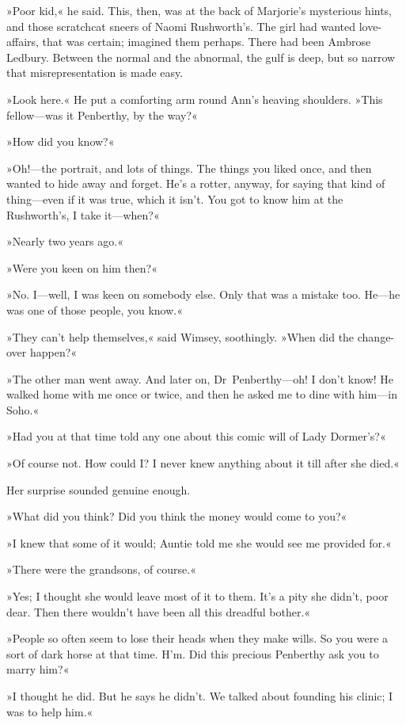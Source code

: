 »Poor kid,« he said. This, then, was at the back of Marjorie's mysterious hints, and those scratchcat sneers of Naomi Rushworth's. The girl had wanted love-affairs, that was certain; imagined them perhaps. There had been Ambrose Ledbury. Between the normal and the abnormal, the gulf is deep, but so narrow that misrepresentation is made easy.

»Look here.« He put a comforting arm round Ann's heaving shoulders. »This fellow—was it Penberthy, by the way?«

»How did you know?«

»Oh!—the portrait, and lots of things. The things you liked once, and then wanted to hide away and forget. He's a rotter, anyway, for saying that kind of thing—even if it was true, which it isn't. You got to know him at the Rushworth's, I take it—when?«

»Nearly two years ago.«

»Were you keen on him then?«

»No. I—well, I was keen on somebody else. Only that was a mistake too. He—he was one of those people, you know.«

»They can't help themselves,« said Wimsey, soothingly. »When did the change-over happen?«

»The other man went away. And later on, Dr~Penberthy—oh! I don't know! He walked home with me once or twice, and then he asked me to dine with him—in Soho.«

»Had you at that time told any one about this comic will of Lady Dormer's?«

»Of course not. How could I\@? I never knew anything about it till after she died.«

Her surprise sounded genuine enough.

»What did you think? Did you think the money would come to you?«

»I knew that some of it would; Auntie told me she would see me provided for.«

»There were the grandsons, of course.«

»Yes; I thought she would leave most of it to them. It's a pity she didn't, poor dear. Then there wouldn't have been all this dreadful bother.«

»People so often seem to lose their heads when they make wills. So you were a sort of dark horse at that time. H'm. Did this precious Penberthy ask you to marry him?«

»I thought he did. But he says he didn't. We talked about founding his clinic; I was to help him.«

